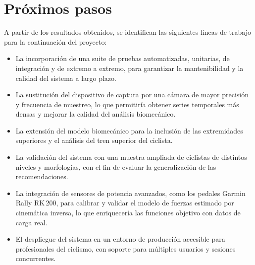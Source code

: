 
\section{Próximos pasos}

A partir de los resultados obtenidos, se identifican las siguientes líneas de
trabajo para la continuación del proyecto:

\begin{itemize}
    \item La incorporación de una suite de pruebas automatizadas, unitarias, de
          integración y de extremo a extremo, para garantizar la mantenibilidad y la
          calidad del sistema a largo plazo.
    \item La sustitución del dispositivo de captura por una cámara de mayor precisión y
          frecuencia de muestreo, lo que permitiría obtener series temporales más densas
          y mejorar la calidad del análisis biomecánico.
    \item La extensión del modelo biomecánico para la inclusión de las extremidades
          superiores y el análisis del tren superior del ciclista.
    \item La validación del sistema con una muestra ampliada de ciclistas de distintos
          niveles y morfologías, con el fin de evaluar la generalización de las
          recomendaciones.
    \item La integración de sensores de potencia avanzados, como los pedales
          Garmin Rally RK\,200, para calibrar y validar el modelo de fuerzas estimado
          por cinemática inversa, lo que enriquecería las funciones objetivo con datos de
          carga real.
    \item El despliegue del sistema en un entorno de producción accesible para
          profesionales del ciclismo, con soporte para múltiples usuarios y sesiones
          concurrentes.
\end{itemize}
